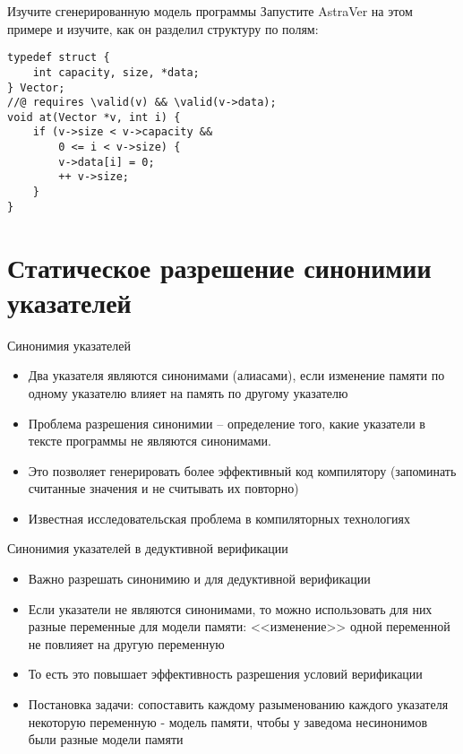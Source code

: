 \documentclass[hyperref={unicode=true}]{beamer}
\begin{document}
    \begin{frame}[fragile]{Изучите сгенерированную модель программы}
    Запустите AstraVer на этом примере
    и изучите, как он разделил структуру
    по полям:
    \begin{lstlisting}
typedef struct {
    int capacity, size, *data;
} Vector;
//@ requires \valid(v) && \valid(v->data);
void at(Vector *v, int i) {
    if (v->size < v->capacity &&
        0 <= i < v->size) {
        v->data[i] = 0;
        ++ v->size;
    }
}    \end{lstlisting}
    \end{frame}

    \section{Статическое разрешение синонимии указателей}

    \begin{frame}{Синонимия указателей}
    \begin{itemize}
    \item
    Два указателя являются синонимами (алиасами), если
    изменение памяти по одному указателю влияет на
    память по другому указателю
    \item
    Проблема разрешения синонимии -- определение того, какие
    указатели в тексте программы не являются синонимами.
    \item
    Это позволяет генерировать более эффективный код компилятору
    (запоминать считанные значения и не считывать их повторно)
    \item
    Известная исследовательская проблема в компиляторных
    технологиях
    \end{itemize}
    \end{frame}

    \begin{frame}{Синонимия указателей в дедуктивной верификации}
    \begin{itemize}
    \item
    Важно разрешать синонимию и для дедуктивной верификации
    \item
    Если указатели не являются синонимами, то можно использовать
    для них разные переменные для модели памяти: <<изменение>>
    одной переменной не повлияет на другую переменную
    \item
    То есть это повышает эффективность разрешения условий верификации
    \item
    Постановка задачи: сопоставить каждому разыменованию каждого
    указателя некоторую переменную - модель памяти, чтобы у заведома
    несинонимов были разные модели памяти
    \end{itemize}
    \end{frame}
\end{document}
